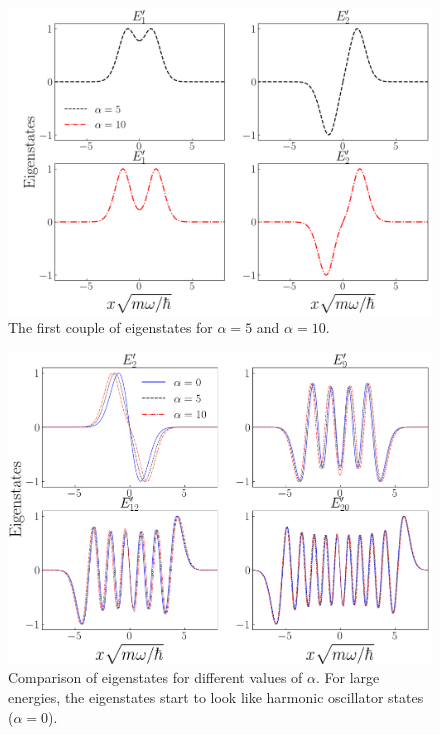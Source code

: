 \documentclass[twocolumn]{article}
\begin{document}
\begin{large}
\begin{figure}
    \label{4apr2029}
\end{figure}
\begin{figure}[b!]
    \centering
    \includegraphics[scale=0.31]{first_eigenstates_alphas.png}
    \caption{The first couple of eigenstates for $\alpha=5$ and $\alpha=10$.}
    \label{5apr0727}
\end{figure}
\begin{figure}[t!]
    \centering
    \includegraphics[scale=0.33]{high_energy_comparison.png}
    \caption{Comparison of eigenstates for different values of $\alpha$. For large energies, the eigenstates start to look like harmonic oscillator states ($\alpha=0$).}
    \label{4apr2029}
\end{figure}

\end{large}
\end{document}
